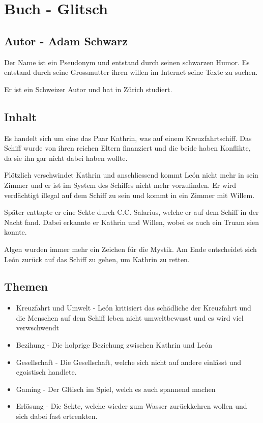 \documentclass{article}
\begin{document}
\section{Buch - Glitsch}
\subsection{Autor - Adam Schwarz}
Der Name ist ein Pseudonym und entstand durch seinen schwarzen Humor. Es entstand durch seine Grossmutter ihren willen im Internet seine Texte zu suchen.

Er ist ein Schweizer Autor und hat in Zürich studiert.
\subsection{Inhalt}
\begin{multicols}{2}
Es handelt sich um eine das Paar Kathrin, was auf einem Kreuzfahrtschiff. Das Schiff wurde von ihren reichen Eltern finanziert und die beide haben Konflikte, da sie ihn gar nicht dabei haben wollte.

Plötzlich verschwindet Kathrin und anschliessend kommt León nicht mehr in sein Zimmer und er ist im System des Schiffes nicht mehr vorzufinden. Er wird verdächtigt illegal auf dem Schiff zu sein und kommt in ein Zimmer mit Willem.

Später enttapte er eine Sekte durch C.C. Salarius, welche er auf dem Schiff in der Nacht fand. Dabei erkannte er Kathrin und Willen, wobei es auch ein Truam sien konnte.

Algen wurden immer mehr ein Zeichen für die Mystik. Am Ende entscheidet sich León zurück auf das Schiff zu gehen, um Kathrin zu retten.
\end{multicols}
\subsection{Themen}
\begin{itemize}[parsep=0pt]
    \item Kreuzfahrt und Umwelt - León kritisiert das schädliche der Kreuzfahrt und die Menschen auf dem Schiff leben nicht umweltbewusst und es wird viel verwschwendt
    \item Bezihung - Die holprige Beziehung zwischen Kathrin und León
    \item Gesellschaft - Die Gesellschaft, welche sich nicht auf andere einlässt und egoistisch handlete.
    \item Gaming - Der Gltisch im Spiel, welch es auch spannend machen
    \item Erlösung - Die Sekte, welche wieder zum Wasser zurückkehren wollen und sich dabei fast ertrenkten.
\end{itemize}
\end{document}
